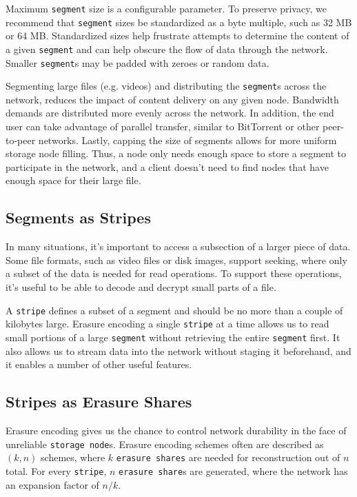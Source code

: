 \documentclass[11pt,fleqn,openany]{book}
\newcommand{\x}[1]{{\tt #1}} \newcommand{\code}[1]{{\em #1}}
\begin{document}
Maximum \x{segment} size is a configurable parameter. To preserve privacy, we
recommend that \x{segment} sizes be standardized as a byte multiple, such as
32 MB or 64 MB.
Standardized sizes help frustrate attempts to determine the content of a given
\x{segment} and can help obscure the flow of data through the network.
Smaller \x{segment}s may be padded with zeroes or random data.

Segmenting large files (e.g. videos) and distributing the \x{segment}s
across the network, reduces the impact of content delivery on any
given node.
Bandwidth demands are distributed more evenly across the network.
In addition, the end user can take advantage of parallel transfer, similar to
BitTorrent or other peer-to-peer networks. Lastly, capping the size of segments
allows for more uniform storage node filling. Thus, a node only needs enough
space to store a segment to participate in the network,
and a client doesn't need
to find nodes that have enough space for their large file.

\subsection{Segments as Stripes}

In many situations, it's important to access a subsection of a larger piece of
data. Some file formats, such as video files or disk images, support seeking,
where only a subset of the data is needed for read operations.
To support these operations,
it's useful to be able to decode and decrypt small parts of a file.

A \x{stripe} defines a subset of a segment and should be no more than a
couple of kilobytes large. Erasure encoding
a single \x{stripe} at a time allows us to read small portions of a
large \x{segment} without retrieving the entire \x{segment} first.
It also allows us to stream data into the
network without staging it beforehand, and it enables a number of other useful
features.

\subsection{Stripes as Erasure Shares}

Erasure encoding gives us the chance to control network durability in the face
of unreliable \x{storage node}s. Erasure encoding schemes often are
described as $(k, n)$ schemes, where $k$ \x{erasure shares} are needed for
reconstruction out of $n$ total. For every \x{stripe}, $n$ \x{erasure share}s
are generated, where the network has an expansion factor of $n/k$.
\end{document}
